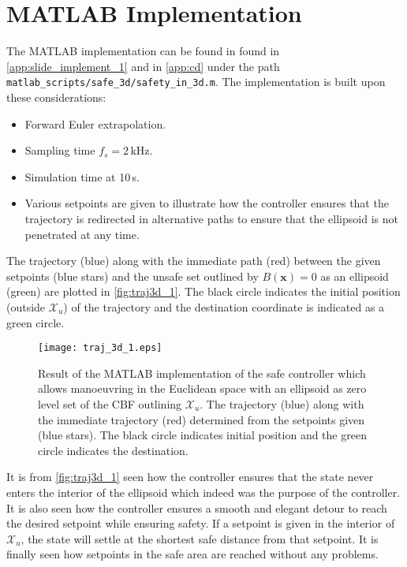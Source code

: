 \section{MATLAB Implementation}\label{sec:3d_matlab}
The MATLAB implementation can be found in found in \autoref{app:slide_implement_1} and in \autoref{app:cd} under the path \texttt{matlab\_scripts/safe\_3d/safety\_in\_3d.m}. The implementation is built upon these considerations:
\begin{itemize}
\item Forward Euler extrapolation.
\item Sampling time $f_s= 2\,$kHz.
\item Simulation time at 10\,s.
\item Various setpoints are given to illustrate how the controller ensures that the trajectory is redirected in alternative paths to ensure that the ellipsoid is not penetrated at any time.
\end{itemize}
The trajectory (blue) along with the immediate path (red) between  the given setpoints  (blue stars) and the unsafe set outlined by $B(\textbf{x})=0$ as an ellipsoid (green) are plotted in \autoref{fig:traj3d_1}. The black circle indicates the initial position (outside $\mathcal{X}_u$) of the trajectory and the destination coordinate is indicated as a green circle.
\begin{figure}[H]
\centering
	\hspace*{-2cm}
	\texttt{[image: traj\_3d\_1.eps]}
	\caption{Result of the MATLAB implementation of the safe controller which allows manoeuvring in the Euclidean space with an ellipsoid as zero level set of the CBF outlining $\mathcal{X}_u$. The trajectory (blue) along with the immediate trajectory (red) determined from the setpoints given (blue stars). The black circle indicates initial position and the green circle indicates the destination.}
	\label{fig:traj3d_1}
\end{figure}
It is from \autoref{fig:traj3d_1} seen how the controller ensures that the state  never enters the interior of the ellipsoid which indeed was the purpose of the controller. It is also seen how the controller ensures a smooth and elegant detour to reach the desired setpoint while ensuring safety. If a setpoint is given in the interior of $\mathcal{X}_u$, the state will settle at the shortest safe distance from that setpoint. It is finally seen how setpoints in the safe area are reached without any problems.

